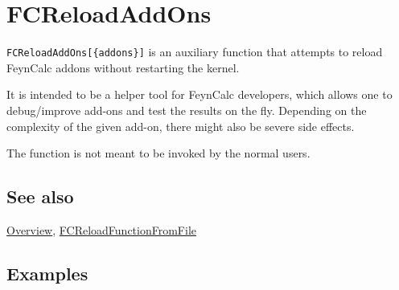 \documentclass[../FeynCalcManual.tex]{subfiles}
\begin{document}
\hypertarget{fcreloadaddons}{%
\section{FCReloadAddOns}\label{fcreloadaddons}}

\texttt{FCReloadAddOns[\allowbreak{}\{\allowbreak{}addons\}]} is an
auxiliary function that attempts to reload FeynCalc addons without
restarting the kernel.

It is intended to be a helper tool for FeynCalc developers, which allows
one to debug/improve add-ons and test the results on the fly. Depending
on the complexity of the given add-on, there might also be severe side
effects.

The function is not meant to be invoked by the normal users.

\subsection{See also}

\hyperlink{toc}{Overview},
\hyperlink{fcreloadfunctionfromfile}{FCReloadFunctionFromFile}

\subsection{Examples}
\end{document}
